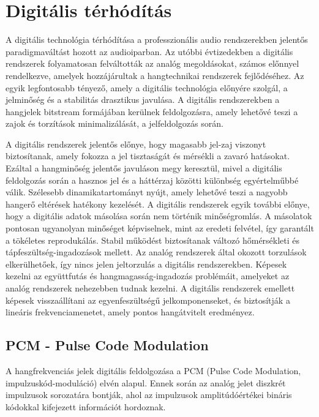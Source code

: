 \section{Digitális térhódítás} %
A digitális technológia térhódítása a professzionális audio rendszerekben jelentős paradigmaváltást hozott az audioiparban. 
Az utóbbi évtizedekben a digitális rendszerek folyamatosan felváltották az analóg megoldásokat, számos előnnyel rendelkezve, 
amelyek hozzájárultak a hangtechnikai rendszerek fejlődéséhez. 
Az egyik legfontosabb tényező, amely a digitális technológia előnyére szolgál, a jelminőség és a stabilitás drasztikus javulása. 
A digitális rendszerekben a hangjelek bitstream formájában kerülnek feldolgozásra, amely lehetővé teszi a zajok és torzítások minimalizálását,
a jelfeldolgozás során. 

A digitális rendszerek jelentős előnye, hogy magasabb jel-zaj viszonyt biztosítanak, amely fokozza a jel tisztaságát és mérsékli a zavaró hatásokat. 
Ezáltal a hangminőség jelentős javuláson megy keresztül, mivel a digitális feldolgozás során a hasznos jel és a 
háttérzaj közötti különbség egyértelműbbé válik.
Szélesebb dinamikatartományt nyújt, amely lehetővé teszi a nagyobb hangerő eltérések hatékony kezelését. 
A digitális rendszerek egyik további előnye, hogy a digitális adatok másolása során nem történik minőségromlás. 
A másolatok pontosan ugyanolyan minőséget képviselnek, mint az eredeti felvétel, így garantált a tökéletes reprodukálás.
Stabil működést biztosítanak változó hőmérsékleti és tápfeszültség-ingadozások mellett. 
Az analóg rendszerek által okozott torzulások elkerülhetőek, így nincs jelen jeltorzulás a digitális rendszerekben.
Képesek kezelni az együttfutás és hangmagasság-ingadozás problémáit, amelyeket az analóg rendszerek nehezebben tudnak kezelni.
A digitális rendszerek emellett képesek visszaállítani az egyenfeszültségű jelkomponenseket, és biztosítják 
a lineáris frekvenciamenetet, amely pontos hangátvitelt eredményez. 
\subsection{PCM - Pulse Code Modulation}
A hangfrekvenciás jelek digitális feldolgozása a PCM (Pulse Code Modulation, impulzuskód-moduláció) elvén alapul. 
Ennek során az analóg jelet diszkrét impulzusok sorozatára bontják, ahol az impulzusok 
amplitúdóértékei bináris kódokkal kifejezett információt hordoznak.

